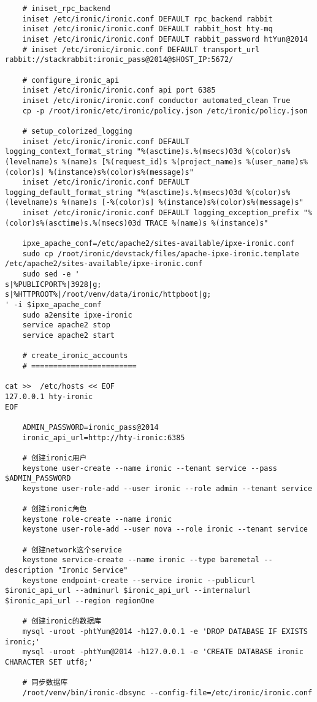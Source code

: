 \documentclass[a4paper,left=1.5cm,right=1.5cm,11pt]{article}
\begin{document}
\begin{lstlisting}
	# iniset_rpc_backend
	iniset /etc/ironic/ironic.conf DEFAULT rpc_backend rabbit
	iniset /etc/ironic/ironic.conf DEFAULT rabbit_host hty-mq
	iniset /etc/ironic/ironic.conf DEFAULT rabbit_password htYun@2014
	# iniset /etc/ironic/ironic.conf DEFAULT transport_url rabbit://stackrabbit:ironic_pass@2014@$HOST_IP:5672/

	# configure_ironic_api
	iniset /etc/ironic/ironic.conf api port 6385
    iniset /etc/ironic/ironic.conf conductor automated_clean True
	cp -p /root/ironic/etc/ironic/policy.json /etc/ironic/policy.json
	
	# setup_colorized_logging
	iniset /etc/ironic/ironic.conf DEFAULT logging_context_format_string "%(asctime)s.%(msecs)03d %(color)s%(levelname)s %(name)s [%(request_id)s %(project_name)s %(user_name)s%(color)s] %(instance)s%(color)s%(message)s"
    iniset /etc/ironic/ironic.conf DEFAULT logging_default_format_string "%(asctime)s.%(msecs)03d %(color)s%(levelname)s %(name)s [-%(color)s] %(instance)s%(color)s%(message)s"
	iniset /etc/ironic/ironic.conf DEFAULT logging_exception_prefix "%(color)s%(asctime)s.%(msecs)03d TRACE %(name)s %(instance)s"

	ipxe_apache_conf=/etc/apache2/sites-available/ipxe-ironic.conf
	sudo cp /root/ironic/devstack/files/apache-ipxe-ironic.template /etc/apache2/sites-available/ipxe-ironic.conf
	sudo sed -e '
s|%PUBLICPORT%|3928|g;
s|%HTTPROOT%|/root/venv/data/ironic/httpboot|g;
' -i $ipxe_apache_conf
	sudo a2ensite ipxe-ironic
	service apache2 stop
	service apache2 start

	# create_ironic_accounts
	# ========================

cat >>  /etc/hosts << EOF
127.0.0.1 hty-ironic
EOF

	ADMIN_PASSWORD=ironic_pass@2014
	ironic_api_url=http://hty-ironic:6385

	# 创建ironic用户
	keystone user-create --name ironic --tenant service --pass $ADMIN_PASSWORD
	keystone user-role-add --user ironic --role admin --tenant service

	# 创建ironic角色
	keystone role-create --name ironic
	keystone user-role-add --user nova --role ironic --tenant service

	# 创建network这个service
	keystone service-create --name ironic --type baremetal --description "Ironic Service"
	keystone endpoint-create --service ironic --publicurl $ironic_api_url --adminurl $ironic_api_url --internalurl $ironic_api_url --region regionOne
	
	# 创建ironic的数据库
	mysql -uroot -phtYun@2014 -h127.0.0.1 -e 'DROP DATABASE IF EXISTS ironic;'
	mysql -uroot -phtYun@2014 -h127.0.0.1 -e 'CREATE DATABASE ironic CHARACTER SET utf8;'
	
	# 同步数据库
	/root/venv/bin/ironic-dbsync --config-file=/etc/ironic/ironic.conf
	\end{lstlisting}
\end{document}
